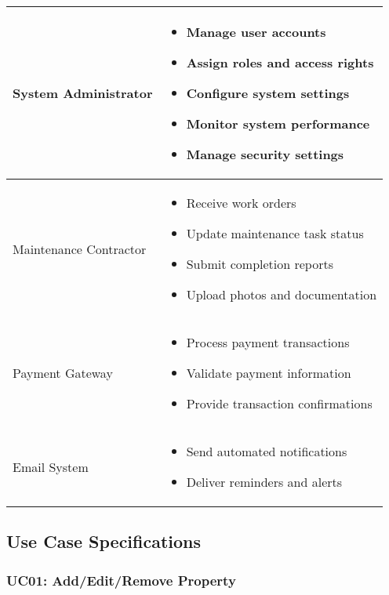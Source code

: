 \documentclass[12pt]{article}
\begin{document}
\begin{longtable}{|p{4cm}|p{10cm}|}
System Administrator & 
\begin{itemize}
    \item Manage user accounts
    \item Assign roles and access rights
    \item Configure system settings
    \item Monitor system performance
    \item Manage security settings
\end{itemize} \\
\hline

Maintenance Contractor & 
\begin{itemize}
    \item Receive work orders
    \item Update maintenance task status
    \item Submit completion reports
    \item Upload photos and documentation
\end{itemize} \\
\hline

Payment Gateway & 
\begin{itemize}
    \item Process payment transactions
    \item Validate payment information
    \item Provide transaction confirmations
\end{itemize} \\
\hline

Email System & 
\begin{itemize}
    \item Send automated notifications
    \item Deliver reminders and alerts
\end{itemize} \\
\hline
\end{longtable}

\subsection{Use Case Specifications}

\subsubsection{UC01: Add/Edit/Remove Property}
\end{document}
